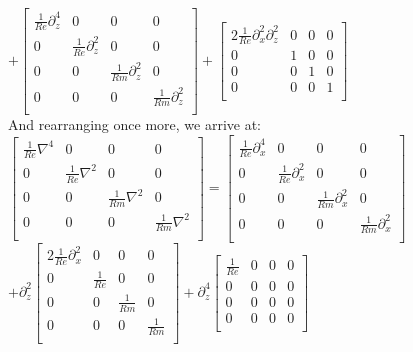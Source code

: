 \documentclass[letterpaper,12pt]{article}
\newcommand\reye{\mathrel{Re}}
\newcommand\reym{\mathrel{Rm}}
\begin{document}
$+ \left[\begin{matrix}
\frac{1}{\reye}\partial_z^4 & 0 & 0 & 0 \\
0 & \frac{1}{\reye}\partial_z^2 & 0 & 0 \\
0 & 0 & \frac{1}{\reym} \partial_z^2 & 0 \\
0 & 0 & 0 & \frac{1}{\reym} \partial_z^2 \\ \end{matrix} \right] + \left[ \begin{matrix}
2 \frac{1}{\reye} \partial_x^2\partial_z^2 & 0 & 0 & 0 \\
0 & 1 & 0 & 0 \\
0 & 0 & 1 & 0 \\
0 & 0 & 0 & 1\\ \end{matrix}\right]$ \\

And rearranging once more, we arrive at: \\

$\left[\begin{matrix}
\frac{1}{\reye} \nabla^4 & 0 & 0 & 0 \\
0 & \frac{1}{\reye}\nabla^2 & 0 & 0 \\
0 & 0 & \frac{1}{\reym}\nabla^2 & 0 \\
0 & 0 & 0 & \frac{1}{\reym}\nabla^2 \\ 
\end{matrix}\right] = \left[\begin{matrix}
\frac{1}{\reye}\partial_x^4 & 0 & 0 & 0 \\
0 & \frac{1}{\reye}\partial_x^2 & 0 &0 \\
0 & 0 & \frac{1}{\reym}\partial_x^2 & 0 \\
0 & 0 & 0 & \frac{1}{\reym}\partial_x^2 \\ \end{matrix}\right] $ \\

$+ \partial_z^2 \left[\begin{matrix}
2\frac{1}{\reye} \partial_x^2 & 0 & 0 & 0 \\
0 & \frac{1}{\reye} & 0 & 0 \\
0 & 0 & \frac{1}{\reym} & 0 \\
0 & 0 & 0 & \frac{1}{\reym} \\ \end{matrix}\right] + \partial_z^4 \left[\begin{matrix}
\frac{1}{\reye} & 0 & 0 & 0 \\
0 & 0 & 0 & 0 \\
0 & 0 & 0 & 0 \\
0 & 0 & 0 & 0 \\ \end{matrix}\right] $ \\
\end{document}
